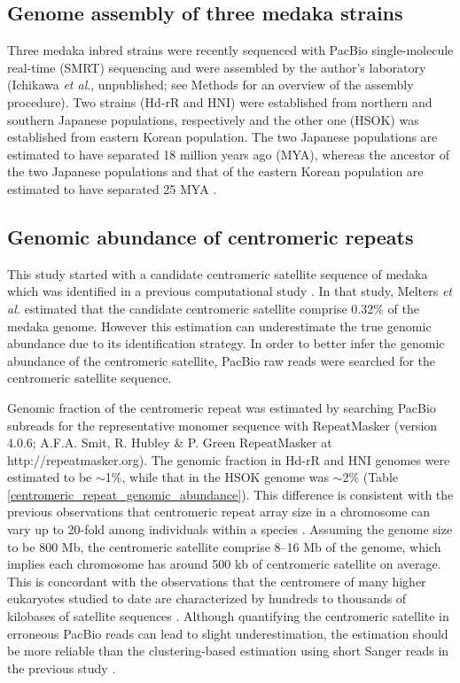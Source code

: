 \subsection*{Genome assembly of three medaka strains}
  Three medaka inbred strains were recently sequenced with PacBio single-molecule real-time (SMRT) sequencing and were assembled by the author's laboratory (Ichikawa \textit{et al}., unpublished; see Methods for an overview of the assembly procedure). Two strains (Hd-rR and HNI) were established from northern and southern Japanese populations, respectively and the other one (HSOK) was established from eastern Korean population. The two Japanese populations are estimated to have separated 18 million years ago (MYA), whereas the ancestor of the two Japanese populations and that of the eastern Korean population are estimated to have separated 25 MYA \cite{Setiamarga2009}.



\subsection*{Genomic abundance of centromeric repeats}
  This study started with a candidate centromeric satellite sequence of medaka which was identified in a previous computational study \cite{Melters2013}. In that study, Melters \textit{et al.} estimated that the candidate centromeric satellite comprise 0.32\% of the medaka genome. However this estimation can underestimate the true genomic abundance due to its identification strategy. In order to better infer the genomic abundance of the centromeric satellite, PacBio raw reads were searched for the centromeric satellite sequence.

  Genomic fraction of the centromeric repeat was estimated by searching PacBio subreads for the representative monomer sequence with RepeatMasker (version 4.0.6; A.F.A. Smit, R. Hubley \& P. Green RepeatMasker at http://repeatmasker.org). The genomic fraction in Hd-rR and HNI genomes were estimated to be $\sim$1\%, while that in the HSOK genome was $\sim$2\% (Table \ref{centromeric_repeat_genomic_abundance}). This difference is consistent with the previous observations that centromeric repeat array size in a chromosome can vary up to 20-fold among individuals within a species \cite{Miga2014}. Assuming the genome size to be 800 Mb, the centromeric satellite comprise 8--16 Mb of the genome, which implies each chromosome has around 500 kb of centromeric satellite on average. This is concordant with the observations that the centromere of many higher eukaryotes studied to date are characterized by hundreds to thousands of kilobases of satellite sequences \cite{Plohl2014}. Although quantifying the centromeric satellite in erroneous PacBio reads can lead to slight underestimation, the estimation should be more reliable than the clustering-based estimation using short Sanger reads in the previous study \cite{Melters2013}.


